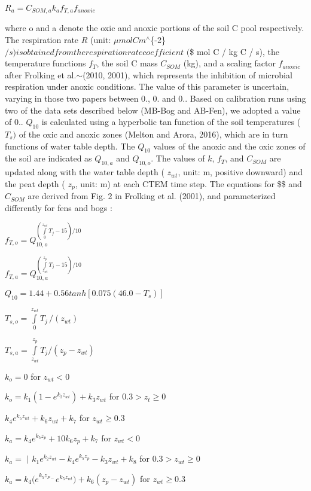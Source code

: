 $ R_{a}=C_{SOM,a}k_{a}f_{T,{a}}f_{anoxic} $

where o and a denote the oxic and anoxic portions of the soil C pool respectively. The respiration rate $R$ (unit\+: $\mu mol C m$$^\wedge$\{-\/2\} $/s) is obtained from the respiration rate coefficient $ $ ($\$ mol C / kg C / s), the temperature functions $f_T$, the soil C mass $C_{SOM}$ (kg), and a scaling factor $f_{anoxic}$ after Frolking et al.$\sim$(2010, 2001), which represents the inhibition of microbial respiration under anoxic conditions. The value of this parameter is uncertain, varying in those two papers between 0., 0. and 0.. Based on calibration runs using two of the data sets described below (M\+B-\/\+Bog and A\+B-\/\+Fen), we adopted a value of 0.. $Q_{10}$ is calculated using a hyperbolic tan function of the soil temperatures ( $T_s)$ of the oxic and anoxic zones (Melton and Arora, 2016), which are in turn functions of water table depth. The $Q_{10}$ values of the anoxic and the oxic zones of the soil are indicated as $Q_{10,a}$ and $Q_{10,o}$. The values of $k$, $f_T$, and $C_{SOM}$ are updated along with the water table depth ( $z_{wt}$, unit\+: m, positive downward) and the peat depth ( $z_p$, unit\+: m) at each C\+T\+E\+M time step. The equations for \$\$ and $C_{SOM}$ are derived from Fig. 2 in Frolking et al. (2001), and parameterized differently for fens and bogs \+:

$ f_{T,o} =Q_{10,o}^{\left(\int\limits_{0}^{z_{wt}} T_{j} -15\right)/10} $

$ f_{T,{a}} =Q_{10,{a}}^{\left(\int\limits_{z_{wt}}^{z_\mathrm{p}} T_{j} -15\right)/10} $

$ Q_{10}=1.44+0.56 {tanh}[0.075\left( 46.0-T_{s} \right)] $

$ T_{s,o}=\int\limits_{0}^{z_{wt}} T_{j} \, /(z_{wt}) $

$ T_{s,a}=\int\limits_{z_{wt}}^{z_{p}} T_{j} /(z_{p}-z_{wt}) $

$ k_{o}= 0 $ for $ z_{wt}<0 $

$ k_{o}= k_{1}\left( 1-e^{k_{2}z_{wt}} \right)+k_{3}z_{wt} $ for $0.3 > z_t \ge 0$

$ k_{4}e^{k_{5}z_{wt}}+k_{6}z_{wt}+k_{7} $ for $ z_{wt}\ge 0.3 $

$ k_{a}= k_{4}e^{k_{5}z_{p}}+{10k}_{6}z_{p}+k_{7} $ for $ z_{wt}<0 $

$ k_{a} = $ $\vert$ $ k_1 e^{ k_2 z_{wt} } - k_4 e^{k_5 z_p} -k_3 z_{wt}+k_8 $ for $0.3>z_{wt} \ge 0 $

$ k_{a}= k_{4}{(e}^{k_{5}z_{P-}}e^{k_{5}z_{wt}})+k_{6}\left( z_p-z_{wt} \right)$ for $ z_{wt}\ge 0.3 $


